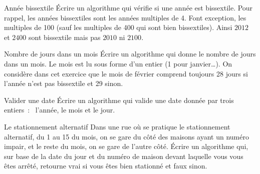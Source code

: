 		\begin{Exercice}{Année bissextile}
			Écrire un algorithme qui vérifie si une année est bissextile. 
			Pour rappel, les années bissextiles sont les années multiples de 4. 
			Font exception, les multiples de 100 
			(sauf les multiples de 400 qui sont bien bissextiles). 
			Ainsi $2012$ et $2400$ sont bissextile mais pas $2010$ ni $2100$.
		\end{Exercice}
		
		\begin{Exercice}{Nombre de jours dans un mois}
			Écrire un algorithme qui donne le nombre de jours dans un mois. 
			Le mois est lu sous forme d’un entier (1 pour janvier\dots).
			On considère dans cet exercice que le mois de février
			comprend toujours 28 jours si l'année n'est pas bissextile et 29 sinon.
		\end{Exercice}

		\begin{Exercice}{Valider une date}
			Écrire un algorithme qui valide une date donnée par trois entiers~:~
			l’année, le mois et le jour.
		\end{Exercice}
		
		\begin{Exercice}{Le stationnement alternatif}
			Dans une rue où se pratique le stationnement alternatif, 
			du 1 au 15 du mois, on se gare du côté des maisons ayant un numéro impair, 
			et le reste du mois, on se gare de l’autre côté. 
			Écrire un algorithme qui, sur base de la date du jour et du numéro de maison
			devant laquelle vous vous êtes arrêté, 
			retourne vrai si vous êtes bien stationné et faux sinon.
		\end{Exercice}
		
